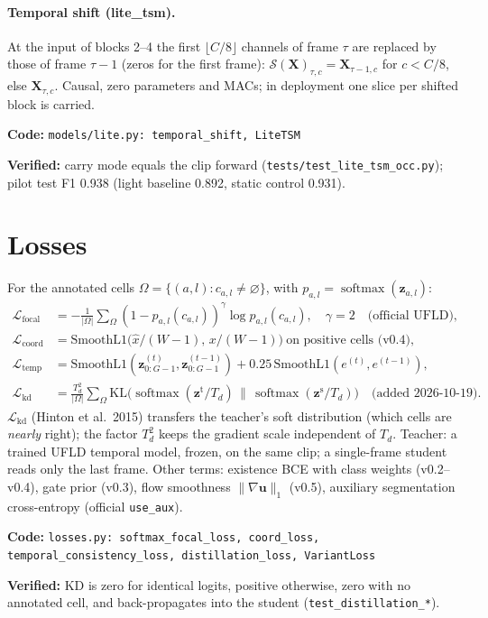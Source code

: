 \documentclass[10pt,a4paper]{article}
\newcommand{\code}[1]{\texttt{\small #1}}
\newcommand{\impl}[1]{\par\noindent\textcolor{blue!50!black}{\small\textbf{Code:} \texttt{#1}}\par}
\newcommand{\verif}[1]{\par\noindent\textcolor{green!35!black}{\small\textbf{Verified:} #1}\par}
\newcommand{\softmax}{\operatorname{softmax}}
\theoremstyle{definition}
\begin{document}
\paragraph{Temporal shift (lite\_tsm).} At the input of blocks 2--4 the first $\lfloor C/8\rfloor$ channels of frame
$\tau$ are replaced by those of frame $\tau-1$ (zeros for the first frame):
$\mathcal S(\bm X)_{\tau,c}=\bm X_{\tau-1,c}$ for $c<C/8$, else $\bm X_{\tau,c}$. Causal, zero parameters and MACs;
in deployment one slice per shifted block is carried.
\impl{models/lite.py: temporal\_shift, LiteTSM}
\verif{carry mode equals the clip forward (\code{tests/test\_lite\_tsm\_occ.py}); pilot test F1 0.938 (light
baseline 0.892, static control 0.931).}

\section{Losses}
For the annotated cells $\Omega=\{(a,l):c_{a,l}\neq\varnothing\}$, with $p_{a,l}=\softmax(\bm z_{a,l})$:
\begin{align}
\mathcal L_{\mathrm{focal}}&=-\tfrac{1}{|\Omega|}\textstyle\sum_{\Omega}(1-p_{a,l}(c_{a,l}))^{\gamma}\log p_{a,l}(c_{a,l}),\quad\gamma=2
\quad\text{(official UFLD)},\\
\mathcal L_{\mathrm{coord}}&=\mathrm{SmoothL1}\big(\hat x/(W-1),\,x/(W-1)\big)\ \text{on positive cells (v0.4)},\\
\mathcal L_{\mathrm{temp}}&=\mathrm{SmoothL1}(\bm z^{(t)}_{0:G-1},\bm z^{(t-1)}_{0:G-1})+0.25\,\mathrm{SmoothL1}(e^{(t)},e^{(t-1)}),\\
\mathcal L_{\mathrm{kd}}&=\tfrac{T_d^2}{|\Omega|}\textstyle\sum_\Omega\mathrm{KL}\big(\softmax(\bm z^{\mathrm{t}}/T_d)\,\|\,\softmax(\bm z^{\mathrm s}/T_d)\big)
\quad\text{(added 2026-10-19)}.
\end{align}
$\mathcal L_{\mathrm{kd}}$ (Hinton et al.\ 2015) transfers the teacher's soft distribution (which cells are
\emph{nearly} right); the factor $T_d^2$ keeps the gradient scale independent of $T_d$. Teacher: a trained UFLD
temporal model, frozen, on the same clip; a single-frame student reads only the last frame.
Other terms: existence BCE with class weights (v0.2--v0.4), gate prior (v0.3), flow smoothness
$\|\nabla\bm u\|_1$ (v0.5), auxiliary segmentation cross-entropy (official \code{use\_aux}).
\impl{losses.py: softmax\_focal\_loss, coord\_loss, temporal\_consistency\_loss, distillation\_loss, VariantLoss}
\verif{KD is zero for identical logits, positive otherwise, zero with no annotated cell, and back-propagates into
the student (\code{test\_distillation\_*}).}
\end{document}
